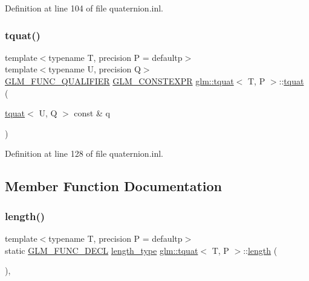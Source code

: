 Definition at line 104 of file quaternion.\+inl.

\mbox{\label{structglm_1_1tquat_a589082b40e5b4c24c6fa6cbc4bd9dea3}} 
\subsubsection{\texorpdfstring{tquat()}{tquat()}\hspace{0.1cm}{\footnotesize\ttfamily [13/13]}}
{\footnotesize\ttfamily template$<$typename T, precision P = defaultp$>$ \\
template$<$typename U, precision Q$>$ \\
\mbox{\hyperlink{setup_8hpp_a33fdea6f91c5f834105f7415e2a64407}{G\+L\+M\+\_\+\+F\+U\+N\+C\+\_\+\+Q\+U\+A\+L\+I\+F\+I\+ER}} \mbox{\hyperlink{setup_8hpp_a08b807947b47031d3a511f03f89645ad}{G\+L\+M\+\_\+\+C\+O\+N\+S\+T\+E\+X\+PR}} \mbox{\hyperlink{structglm_1_1tquat}{glm\+::tquat}}$<$ T, P $>$\+::\mbox{\hyperlink{structglm_1_1tquat}{tquat}} (\begin{DoxyParamCaption}\item[{\mbox{\hyperlink{structglm_1_1tquat}{tquat}}$<$ U, Q $>$ const \&}]{q }\end{DoxyParamCaption})}



Definition at line 128 of file quaternion.\+inl.



\subsection{Member Function Documentation}
\mbox{\label{structglm_1_1tquat_a0580a3d29f748f91ae9f1410e589b925}} 
\subsubsection{\texorpdfstring{length()}{length()}}
{\footnotesize\ttfamily template$<$typename T, precision P = defaultp$>$ \\
static \mbox{\hyperlink{setup_8hpp_ab2d052de21a70539923e9bcbf6e83a51}{G\+L\+M\+\_\+\+F\+U\+N\+C\+\_\+\+D\+E\+CL}} \mbox{\hyperlink{structglm_1_1tquat_ab3ef67a20d129dcb01f042042218ba17}{length\+\_\+type}} \mbox{\hyperlink{structglm_1_1tquat}{glm\+::tquat}}$<$ T, P $>$\+::\mbox{\hyperlink{glad_8h_a1499969c13207ed8ab6f796685d4933f}{length}} (\begin{DoxyParamCaption}{ }\end{DoxyParamCaption})\hspace{0.3cm}{\ttfamily [inline]}, {\ttfamily [static]}}



